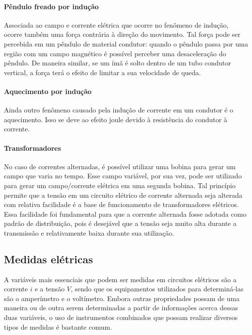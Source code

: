 \paragraph{Pêndulo freado por indução}

Associada ao campo e corrente elétrica que ocorre no fenômeno de indução, ocorre também uma força contrária à direção do movimento. Tal força pode ser percebida em um pêndulo de material condutor: quando o pêndulo passa por uma região com um campo magnético é possível perceber uma desaceleração do pêndulo. De maneira similar, se um ímã é solto dentro de um tubo condutor vertical, a força terá o efeito de limitar a sua velocidade de queda.

\paragraph{Aquecimento por indução}

Ainda outro fenômeno causado pela indução de corrente em um condutor é o aquecimento. Isso se deve ao efeito joule devido à resistência do condutor à corrente.

\paragraph{Transformadores}

No caso de correntes alternadas, é possível utilizar uma bobina para gerar um campo que varia no tempo. Esse campo variável, por sua vez, pode ser utilizado para gerar um campo/corrente elétrica em uma segunda bobina. Tal princípio permite que a tensão em um circuito elétrico de corrente alternada seja alterada com relativa facilidade é a base de funcionamento de transformadores elétricos. Essa facilidade foi fundamental para que a corrente alternada fosse adotada como padrão de distribuição, pois é desejável que a tensão seja muito alta durante a transmissão e relativamente baixa durante sua utilização.

\subsection{Medidas elétricas}

A variáveis mais essenciais que podem ser medidas em circuitos elétricos são a corrente $i$ e a tensão $V$, sendo que os equipamentos utilizados para determiná-las são o amperímetro e o voltímetro. Embora outras propriedades possam de uma maneira ou de outra serem determinadas a partir de informações acerca dessas duas variáveis, o uso de instrumentos combinados que possam realizar diversos tipos de medidas é bastante comum.

